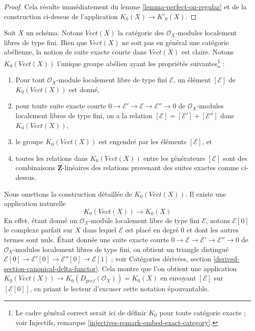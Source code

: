 \begin{proof}
Cela résulte immédiatement du lemme \ref{lemma-perfect-on-regular}
et de la construction ci-dessus de l'application $K_0(X) \to K'_0(X)$.
\end{proof}

\noindent
Soit $X$ un schéma. Notons $\textit{Vect}(X)$ la catégorie
des $\mathcal{O}_X$-modules localement libres de type fini. Bien que
$\textit{Vect}(X)$ ne soit pas en général une catégorie abélienne, la notion
de suite exacte courte dans $\textit{Vect}(X)$ est claire.
Notons $K_0(\textit{Vect}(X))$ l'unique groupe abélien ayant les
propriétés suivantes\footnote{Le cadre général correct serait ici
de définir $K_0$ pour toute catégorie exacte ; voir
Injectifs, remarque \ref{injectives-remark-embed-exact-category}.} :
\begin{enumerate}
\item Pour tout $\mathcal{O}_X$-module localement libre de type fini $\mathcal{E}$,
un élément $[\mathcal{E}]$ de $K_0(\textit{Vect}(X))$ est donné,
\item pour toute suite exacte courte
$0 \to \mathcal{E}' \to \mathcal{E} \to \mathcal{E}'' \to 0$
de $\mathcal{O}_X$-modules localement libres de type fini, on a la relation
$[\mathcal{E}] = [\mathcal{E}'] + [\mathcal{E}'']$ dans $K_0(\textit{Vect}(X))$,
\item le groupe $K_0(\textit{Vect}(X))$ est engendré par les éléments
$[\mathcal{E}]$, et
\item toutes les relations dans $K_0(\textit{Vect}(X))$ entre les générateurs
$[\mathcal{E}]$ sont des combinaisons $\mathbf{Z}$-linéaires
des relations provenant des suites exactes comme ci-dessus.
\end{enumerate}
Nous omettons la construction détaillée de $K_0(\textit{Vect}(X))$.
Il existe une application naturelle
$$
K_0(\textit{Vect}(X)) \longrightarrow K_0(X)
$$
En effet, étant donné un $\mathcal{O}_X$-module localement libre de type fini $\mathcal{E}$,
notons $\mathcal{E}[0]$ le complexe parfait sur $X$ dans lequel
$\mathcal{E}$ est placé en degré $0$ et dont les autres termes sont nuls.
Étant donnée une suite exacte courte
$0 \to \mathcal{E} \to \mathcal{E}' \to \mathcal{E}'' \to 0$ de
$\mathcal{O}_X$-modules localement libres de type fini, on obtient un triangle distingué
$\mathcal{E}[0] \to \mathcal{E}'[0] \to \mathcal{E}''[0] \to \mathcal{E}[1]$ ;
voir Catégories dérivées, section \ref{derived-section-canonical-delta-functor}.
Cela montre que l'on obtient une application
$K_0(\textit{Vect}(X)) \to K_0(D_{perf}(\mathcal{O}_X)) = K_0(X)$
en envoyant $[\mathcal{E}]$ sur $[\mathcal{E}[0]]$,
en priant le lecteur d'excuser cette notation épouvantable.

